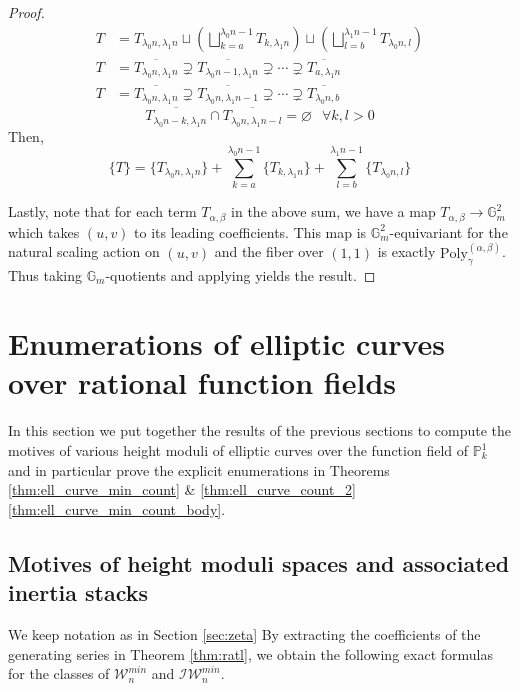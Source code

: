 \documentclass[a4paper,12pt]{amsart}
\theoremstyle{definition}
\newcommand{\bG}{\mathbb{G}}
\newcommand{\bP}{\mathbb{P}}
\newcommand{\cW}{\mathcal{W}}
\newcommand{\cI}{\mathcal{I}}
\begin{document}
\begin{proof}
		\begin{align*}
			T&=T_{\lambda_0n,\lambda_1n} \sqcup \left(\bigsqcup_{k=a}^{\lambda_0n-1} T_{k,\lambda_1n}\right) \sqcup \left(\bigsqcup_{l=b}^{\lambda_1n-1} T_{\lambda_0n,l} \right)\\
			T&=\overline{T_{\lambda_0n,\lambda_1n}} \supsetneq \overline{T_{\lambda_0n-1,\lambda_1n}} \supsetneq \dotsb \supsetneq \overline{T_{a,\lambda_1n}}\\
			T&=\overline{T_{\lambda_0n,\lambda_1n}} \supsetneq \overline{T_{\lambda_0n,\lambda_1n-1}} \supsetneq \dotsb \supsetneq \overline{T_{\lambda_0n,b}}
		\end{align*}
		\[\overline{T_{\lambda_0n-k,\lambda_1n}} \cap \overline{T_{\lambda_0n,\lambda_1n-l}} =\varnothing ~~\; \forall k,l>0 \]
		Then,
		\begin{equation}
			\label{eqn:sum}
			\{T\} =\{T_{\lambda_0n,\lambda_1n}\}+\sum_{k=a}^{\lambda_0n-1}\{T_{k,\lambda_1n}\}+\sum_{l=b}^{\lambda_1n-1}\{T_{\lambda_0n,l}\}
		\end{equation}
		
		Lastly, note that for each term $T_{\alpha, \beta}$ in the above sum, we have a map $T_{\alpha, \beta} \to \bG_m^2$ which takes $(u,v)$ to its leading coefficients. This map is $\bG_m^2$-equivariant for the natural scaling action on $(u,v)$ and the fiber over $(1,1)$ is exactly $\mathrm{Poly}^{(\alpha,\beta)}_\gamma$. Thus taking $\bG_m$-quotients and applying \cite[Prop. 1.1 iii)]{Ekedahl} yields the result. \end{proof}
	
	\section{Enumerations of elliptic curves over rational function fields} \label{sec:enumeration}
	
	In this section we put together the results of the previous sections to compute the motives of various height moduli of elliptic curves over the function field of $\bP^1_{k}$ and in particular prove the explicit enumerations in Theorems \ref{thm:ell_curve_min_count} \& \ref{thm:ell_curve_count_2} \ref{thm:ell_curve_min_count_body}.
	
	\subsection{Motives of height moduli spaces and associated inertia stacks}
	
	We keep notation as in Section \ref{sec:zeta} By extracting the coefficients of the generating series in Theorem \ref{thm:ratl}, we obtain the following exact formulas for the classes of $\cW_n^{min}$ and $\cI \cW_n^{min}$. 
	
\end{document}
